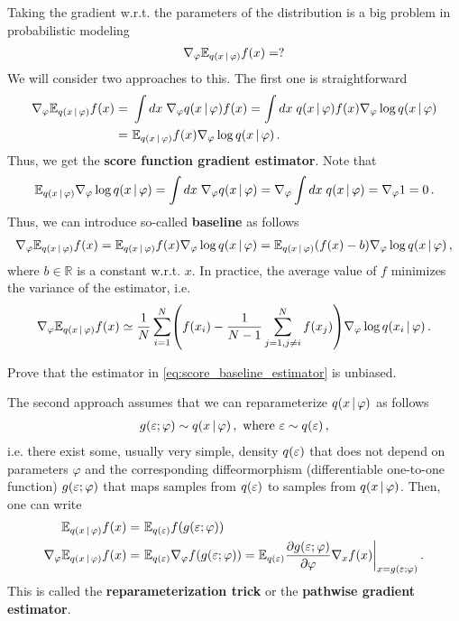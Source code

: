 Taking the gradient w.r.t. the parameters of the distribution is a big problem in probabilistic modeling
\begin{align}
    \nabla_\varphi \mathbb{E}_{q(x\,|\, \varphi)} f(x) = ?
\end{align}
We will consider two approaches to this. The first one is straightforward
\begin{align}
    \nabla_\varphi \mathbb{E}_{q(x\,|\, \varphi)} f(x) =~& \int dx\; \nabla_\varphi q(x\,|\, \varphi) f(x) = \int dx\; q(x\,|\, \varphi) f(x) \nabla_\varphi \log q(x\,|\, \varphi) \\
    =~& \mathbb{E}_{q(x\,|\, \varphi)} f(x) \nabla_\varphi \log q(x\,|\, \varphi)\,.
\end{align}
Thus, we get the \textbf{score function gradient estimator}.
Note that 
\begin{align}
    \mathbb{E}_{q(x\,|\, \varphi)} \nabla_\varphi \log q(x\,|\, \varphi) = \int dx\; \nabla_\varphi q(x\,|\, \varphi) = \nabla_\varphi \int dx\; q(x\,|\, \varphi) = \nabla_\varphi 1 = 0\,.
\end{align}
Thus, we can introduce so-called \textbf{baseline} as follows
\begin{align}
    \nabla_\varphi \mathbb{E}_{q(x\,|\, \varphi)} f(x) = \mathbb{E}_{q(x\,|\, \varphi)} f(x) \nabla_\varphi \log q(x\,|\, \varphi) = \mathbb{E}_{q(x\,|\, \varphi)} (f(x) - b) \nabla_\varphi \log q(x\,|\, \varphi)\,,
\end{align}
where $b \in \mathbb{R}$ is a constant w.r.t. $x$.
In practice, the average value of $f$ minimizes the variance of the estimator, i.e.
\begin{align}
    \nabla_\varphi \mean_{q(x\cond \varphi)} f(x) \simeq \frac{1}{N}\sum_{i=1}^N\left(f(x_i) - \frac{1}{N-1}\sum_{j=1, j\neq i}^Nf(x_j)\right)\nabla_\varphi \log q(x_i\cond \varphi)\,.
    \label{eq:score_baseline_estimator}
\end{align}
\begin{exercise}
    Prove that the estimator in \cref{eq:score_baseline_estimator} is unbiased.
\end{exercise}

The second approach assumes that we can reparameterize $q(x\,|\, \varphi)$ as follows
\begin{align}
    g(\varepsilon; \varphi) \sim q(x\,|\, \varphi)\,, \text{ where } \varepsilon \sim q(\varepsilon)\,,
\end{align}
i.e. there exist some, usually very simple, density $q(\varepsilon)$ that does not depend on parameters $\varphi$ and the corresponding diffeormorphism (differentiable one-to-one function) $g(\varepsilon; \varphi)$ that maps samples from $q(\varepsilon)$ to samples from $q(x\,|\, \varphi)$. Then, one can write
\begin{align}
    \mathbb{E}_{q(x\,|\, \varphi)} f(x) =~& \mathbb{E}_{q(\varepsilon)} 
    f(g(\varepsilon;\varphi))\\
    \nabla_\varphi\mathbb{E}_{q(x\,|\, \varphi)} f(x) =~& \mathbb{E}_{q(\varepsilon)} \nabla_\varphi f(g(\varepsilon;\varphi)) = \mathbb{E}_{q(\varepsilon)} \frac{\partial g(\varepsilon;\varphi)}{\partial \varphi}\nabla_x f(x)\bigg|_{x=g(\varepsilon;\varphi)}\,.
\end{align}
This is called the \textbf{reparameterization trick} or the \textbf{pathwise gradient estimator}.

